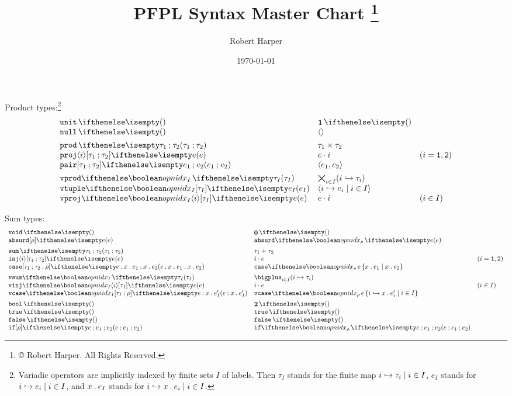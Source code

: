 \documentclass[11pt,twoside]{article}
\title{\textsf{PFPL} Syntax Master Chart%
\footnote{\copyright{} \the\year{} Robert Harper.  All Rights Reserved.}}
\author{Robert Harper}
\date{\today}
\begin{document}
\maketitle{}

\noindent Product types:\footnote{Variadic operators are implicitly indexed by finite sets $I$ of labels.  Then $\tau_I$ stands for the finite map $\finmap{I}{i}{\tau}$, $e_I$ stands for $\finmap{I}{i}{e}$, and $\Abs(x){e_I}$ stands for $\finmap{I}{i}{\Abs(x){e}}$.}
\begin{displaymath}
  \begin{array}{l@{\quad}l@{\quad}l}
    \unitTy{} & \unitTy*{} \\
    \unitEx{} & \unitEx*{} \\[1ex]

    \prodTy{\tau_1}{\tau_2} & \prodTy*{\tau_1}{\tau_2} \\
    \projEx<i>{e} & \projEx*<i>{e} & (i=\kw{1},\kw{2}) \\
    \pairEx{e_1}{e_2} & \pairEx*{e_1}{e_2} \\[1ex]

    \vprodTy<I><i>{\tau} & \vprodTy*{\tau} \\
    \vtupleEx<I>[\tau]{e} & \vtupleEx*<I>{e} \\
    \vprojEx<I><i>[\tau]{e} & \vprojEx*<i>{e} & (i\in I)
  \end{array}
\end{displaymath}

\noindent Sum types:
\begin{displaymath}
  \begin{array}{l@{\quad}l@{\quad}l}
    \voidTy & \voidTy* \\
    \absurdEx[\rho]{e} & \absurdEx*{e} \\[1ex]

    \sumTy{\tau_1}{\tau_2} & \sumTy*{\tau_1}{\tau_2} \\
    \injEx<i>[\tau_1][\tau_2]{e} & \injEx*<i>{e} & (i=\kw{1},\kw{2}) \\
    \caseEx[\tau][\rho]{e}{x}{e} & \caseEx*{e}{x}{e} \\[1ex]

    \vsumTy<I><i>{\tau}  & \vsumTy*<I><i>{\tau} \\
    \vinjEx<I><i>[\tau]{e} & \vinjEx*<I><i>{e} & (i\in I) \\
    \vcaseEx<I>[\rho][\tau]{e}{x}{e'}  & \vcaseEx*<I>{e}{x}{e'} \\[1ex]

    \boolTy & \boolTy* \\
    \trueEx & \trueEx* \\
    \falseEx & \falseEx* \\
    \ifEx{e}{e_1}{e_2} & \ifEx*{e}{e_1}{e_2}
  \end{array}
\end{displaymath}
\end{document}
